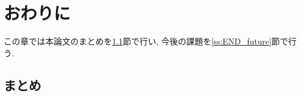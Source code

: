 \documentclass[a4j,11pt]{jarticle}
\def\proposed{DNRBA}
\begin{document}


\clearpage
\section{おわりに}
\label{sec:END}
この章では本論文のまとめを\ref{ss:END_end}節で行い, 今後の課題を\ref{ss:END_future}節で行う.

\subsection{まとめ}
\label{ss:END_end}



\end{document}
